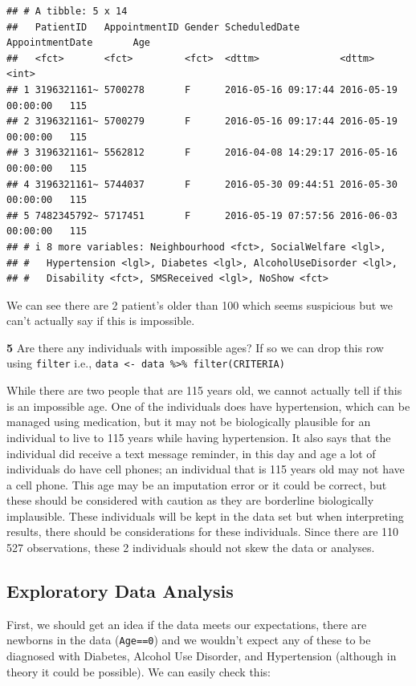 \documentclass[
]{article}
\begin{document}
\begin{verbatim}
## # A tibble: 5 x 14
##   PatientID   AppointmentID Gender ScheduledDate       AppointmentDate       Age
##   <fct>       <fct>         <fct>  <dttm>              <dttm>              <int>
## 1 3196321161~ 5700278       F      2016-05-16 09:17:44 2016-05-19 00:00:00   115
## 2 3196321161~ 5700279       F      2016-05-16 09:17:44 2016-05-19 00:00:00   115
## 3 3196321161~ 5562812       F      2016-04-08 14:29:17 2016-05-16 00:00:00   115
## 4 3196321161~ 5744037       F      2016-05-30 09:44:51 2016-05-30 00:00:00   115
## 5 7482345792~ 5717451       F      2016-05-19 07:57:56 2016-06-03 00:00:00   115
## # i 8 more variables: Neighbourhood <fct>, SocialWelfare <lgl>,
## #   Hypertension <lgl>, Diabetes <lgl>, AlcoholUseDisorder <lgl>,
## #   Disability <fct>, SMSReceived <lgl>, NoShow <fct>
\end{verbatim}

We can see there are 2 patient's older than 100 which seems suspicious
but we can't actually say if this is impossible.

\textbf{5} Are there any individuals with impossible ages? If so we can
drop this row using \texttt{filter} i.e.,
\texttt{data\ \textless{}-\ data\ \%\textgreater{}\%\ filter(CRITERIA)}

While there are two people that are 115 years old, we cannot actually
tell if this is an impossible age. One of the individuals does have
hypertension, which can be managed using medication, but it may not be
biologically plausible for an individual to live to 115 years while
having hypertension. It also says that the individual did receive a text
message reminder, in this day and age a lot of individuals do have cell
phones; an individual that is 115 years old may not have a cell phone.
This age may be an imputation error or it could be correct, but these
should be considered with caution as they are borderline biologically
implausible. These individuals will be kept in the data set but when
interpreting results, there should be considerations for these
individuals. Since there are 110 527 observations, these 2 individuals
should not skew the data or analyses.

\hypertarget{exploratory-data-analysis}{%
\subsection{Exploratory Data Analysis}\label{exploratory-data-analysis}}

First, we should get an idea if the data meets our expectations, there
are newborns in the data (\texttt{Age==0}) and we wouldn't expect any of
these to be diagnosed with Diabetes, Alcohol Use Disorder, and
Hypertension (although in theory it could be possible). We can easily
check this:
\end{document}
